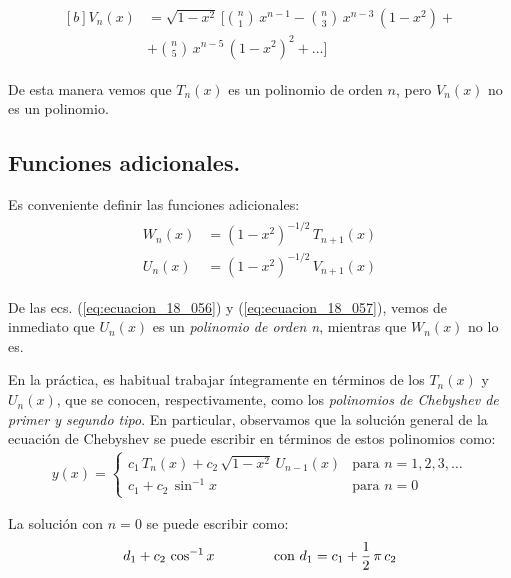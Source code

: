 \begin{align}
\begin{aligned}[b]
V_{n}(x) &= \sqrt{1 - x^{2}} \, \bigg[ \binom{n}{1} \, x^{n-1} - \binom{n}{3} \, x^{n-3} \, (1- x^{2}) + \\[0.5em]
&+ \binom{n}{5} \, x^{n-5} \, (1- x^{2})^{2} + \ldots \bigg]
\end{aligned}
\label{eq:ecuacion_18_057}
\end{align}

De esta manera vemos que $T_{n}(x)$ es un polinomio de orden $n$, pero $V_{n}(x)$ no es un polinomio.

\subsection{Funciones adicionales.}

Es conveniente definir las funciones adicionales:
\begin{align}
\begin{aligned}
W_{n} (x) &= (1 - x^{2})^{-1/2} \, T_{n+1} (x) \\[0.5em]
U_{n} (x) &= (1 - x^{2})^{-1/2} \, V_{n+1} (x)
\end{aligned}
\label{eq:ecuacion_18_058}
\end{align}

De las ecs. (\ref{eq:ecuacion_18_056}) y (\ref{eq:ecuacion_18_057}), vemos de inmediato que $U_{n}(x)$ es un \emph{polinomio de orden n}, mientras que $W_{n}(x)$ no lo es.
\par
En la práctica, es habitual trabajar íntegramente en términos de los $T_{n} (x)$ y $U_{n} (x)$, que se conocen, respectivamente, como los \emph{polinomios de Chebyshev de primer y segundo tipo}. En particular, observamos que la solución general de la ecuación de Chebyshev se puede escribir en términos de estos polinomios como:
\begin{align*}
y(x) = \begin{cases}
c_{1} \, T_{n} (x) + c_{2} \, \sqrt{1 -x^{2}} \, U_{n-1} (x) & \mbox{para  } n = 1, 2, 3, \ldots \\[0.5em]
c_{1} + c_{2} \, \sin^{-1} x & \mbox{para  } n = 0
\end{cases}
\end{align*}

La solución con $n = 0$ se puede escribir como:
\begin{align*}
d_{1} + c_{2} \, \cos^{-1} x \hspace{1.5cm} \mbox{con  } d_{1} = c_{1} + \dfrac{1}{2} \, \pi \, c_{2}
\end{align*}

